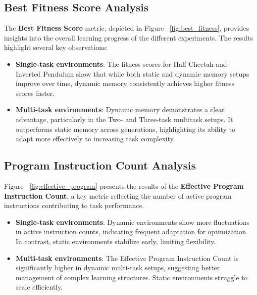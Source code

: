 \documentclass[sigconf]{acmart}
\begin{document}
\subsection{Best Fitness Score Analysis}
The \textbf{Best Fitness Score} metric, depicted in Figure ~\ref{fig:best_fitness}, provides insights into the overall 
learning progress of the different experiments. The results highlight several key observations:

\begin{itemize}
  \item \textbf{Single-task environments}: The fitness scores for Half Cheetah and Inverted Pendulum show that while both static and dynamic memory setups improve over time, dynamic memory consistently achieves higher fitness scores faster.
  \item \textbf{Multi-task environments}: Dynamic memory demonstrates a clear advantage, particularly in the Two- and Three-task multitask setups. It outperforms static memory across generations, highlighting its ability to adapt more effectively to increasing task complexity.
\end{itemize}

\subsection{Program Instruction Count Analysis}
Figure ~\ref{fig:effective_program} presents the results of the \textbf{Effective Program Instruction Count}, a key metric reflecting the number of active 
program instructions contributing to task performance.

\begin{itemize}
  \item \textbf{Single-task environments}: Dynamic environments show more fluctuations in active instruction counts, indicating frequent adaptation for optimization. In contrast, static environments stabilize early, limiting flexibility.
  \item \textbf{Multi-task environments}: The Effective Program Instruction Count is significantly higher in dynamic multi-task setups, suggesting better management of complex learning structures. Static environments struggle to scale efficiently.
\end{itemize}
\end{document}
